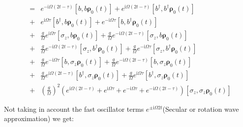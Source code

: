 \documentclass[%
preprint,
onecolumn,
notitlepag,
 amsmath,amssymb,
 aps,
 pra,
]{revtex4-2}
\begin{document}
\begin{equation} 
\begin{align}
     &=& e^{-\mathrm{i} \Omega (2t-\tau)} \left[ b, b \boldsymbol{\rho}_{\mathrm{0}}(t)  \right]  + e^{\mathrm{i} \Omega (2t -\tau)} \left[ b^{\dagger}, b^{\dagger} \boldsymbol{\rho}_{\mathrm{0}}(t)  \right] \\
     &+& e^{\mathrm{i} \Omega \tau} \left[ b^{\dagger}, b \boldsymbol{\rho}_{\mathrm{0}}(t)  \right]  +  e^{- \mathrm{i} \Omega \tau} \left[ b, b^{\dagger}  \boldsymbol{\rho}_{\mathrm{0}}(t)  \right]   \\
     &+& \frac{g}{\Omega} e^{\mathrm{i} \Omega \tau} \left[ \sigma_z, b \boldsymbol{\rho}_{\mathrm{0}}(t)  \right]  + \frac{g}{\Omega} e^{- \mathrm{i} \Omega (2t- \tau)} \left[ \sigma_z, b \boldsymbol{\rho}_{\mathrm{0}}(t)  \right]  \\
     &+& \frac{g}{\Omega} e^{-\mathrm{i} \Omega (2t -\tau) } \left[ \sigma_z, b^{\dagger} \boldsymbol{\rho}_{\mathrm{0}}(t)  \right]  + \frac{g}{\Omega} e^{- \mathrm{i} \Omega  \tau} \left[ \sigma_z, b^{\dagger} \boldsymbol{\rho}_{\mathrm{0}}(t)  \right]  \\
     &+& \frac{g}{\Omega} e^{- \mathrm{i} \Omega \tau} \left[ b, \sigma_z \boldsymbol{\rho}_{\mathrm{0}}(t)  \right]  + \frac{g}{\Omega} e^{- \mathrm{i} \Omega (2t- \tau)} \left[ b, \sigma_z \boldsymbol{\rho}_{\mathrm{0}}(t)  \right] \\
     &+& \frac{g}{\Omega} e^{\mathrm{i} \Omega (2t-\tau) } \left[ b^{\dagger}, \sigma_z \boldsymbol{\rho}_{\mathrm{0}}(t)  \right]  + \frac{g}{\Omega} e^{ \mathrm{i} \Omega  \tau} \left[ b^{\dagger}, \sigma_z \boldsymbol{\rho}_{\mathrm{0}}(t)  \right]  \\
     &+& \left(\frac{g}{\Omega} \right)^2 \left( e^{\mathrm{i} \Omega (2t-\tau) } + e^{\mathrm{i} \Omega \tau} + e^{- \mathrm{i} \Omega \tau} + e^{-\mathrm{i} \Omega (2t-\tau) }\right) \left[ \sigma_z, \sigma_z \boldsymbol{\rho}_{\mathrm{0}}(t)  \right]
\end{align}
\end{equation}


Not taking in account the fast oscillator terms $e^{\pm  \mathrm{i} \Omega 2t }$(Secular or rotation wave approximation) we get: 
\end{document}
